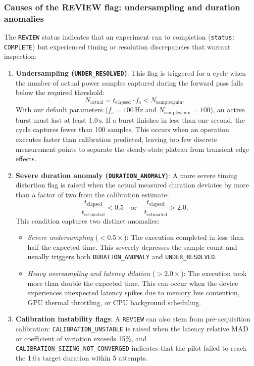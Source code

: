 \subsubsection{Causes of the REVIEW flag: undersampling and duration anomalies}
The \texttt{REVIEW} status indicates that an experiment ran to completion (\texttt{status: COMPLETE}) but experienced timing or resolution discrepancies that warrant inspection:
\begin{enumerate}
    \item \textbf{Undersampling (\texttt{UNDER\_RESOLVED})}: This flag is triggered for a cycle when the number of actual power samples captured during the forward pass falls below the required threshold:
    $$
    N_{\text{actual}} = t_{\text{elapsed}} \cdot f_s < N_{\text{samples,min}}.
    $$
    With our default parameters ($f_s = 100\,\text{Hz}$ and $N_{\text{samples,min}} = 100$), an active burst must last at least $1.0\,\text{s}$. If a burst finishes in less than one second, the cycle captures fewer than 100 samples. This occurs when an operation executes faster than calibration predicted, leaving too few discrete measurement points to separate the steady-state plateau from transient edge effects.
    
    \item \textbf{Severe duration anomaly (\texttt{DURATION\_ANOMALY})}: A more severe timing distortion flag is raised when the actual measured duration deviates by more than a factor of two from the calibration estimate:
    $$
    \frac{t_{\text{elapsed}}}{t_{\text{estimated}}} < 0.5 \quad \text{or} \quad \frac{t_{\text{elapsed}}}{t_{\text{estimated}}} > 2.0.
    $$
    This condition captures two distinct anomalies:
    \begin{itemize}
        \item \emph{Severe undersampling} ($< 0.5\times$): The execution completed in less than half the expected time. This severely depresses the sample count and usually triggers both \texttt{DURATION\_ANOMALY} and \texttt{UNDER\_RESOLVED}.
        \item \emph{Heavy oversampling and latency dilation} ($> 2.0\times$): The execution took more than double the expected time. This can occur when the device experiences unexpected latency spikes due to memory bus contention, GPU thermal throttling, or CPU background scheduling.
    \end{itemize}
    
    \item \textbf{Calibration instability flags}: A \texttt{REVIEW} can also stem from pre-acquisition calibration: \texttt{CALIBRATION\_UNSTABLE} is raised when the latency relative MAD or coefficient of variation exceeds 15\%, and \texttt{CALIBRATION\_SIZING\_NOT\_CONVERGED} indicates that the pilot failed to reach the 1.0\,s target duration within 5 attempts.
\end{enumerate}

